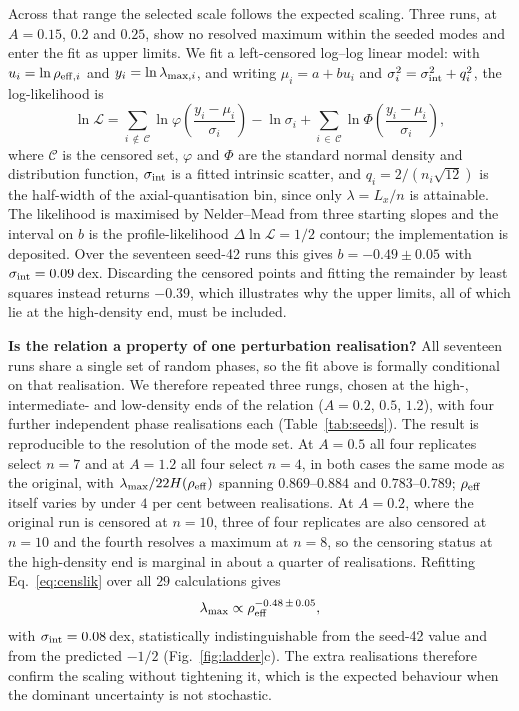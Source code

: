 \documentclass[usenatbib,twoside,twocolumn]{mnras}
\begin{document}
Across that range the selected scale follows the expected scaling. Three runs, at $A=0.15$, $0.2$ and $0.25$, show no resolved maximum within the seeded modes and enter the fit as upper limits. We fit a left-censored log--log linear model: with $u_i=\ln\rho_{{\rm eff},i}$ and $y_i=\ln\lambda_{{\rm max},i}$, and writing $\mu_i=a+bu_i$ and $\sigma_i^2=\sigma_{\rm int}^2+q_i^2$, the log-likelihood is
\begin{equation}
\ln\mathcal{L}=\sum_{i\,\notin\,\mathcal{C}}\ln\varphi\!\left(\frac{y_i-\mu_i}{\sigma_i}\right)-\ln\sigma_i
+\sum_{i\,\in\,\mathcal{C}}\ln\Phi\!\left(\frac{y_i-\mu_i}{\sigma_i}\right),
\label{eq:censlik}
\end{equation}
where $\mathcal{C}$ is the censored set, $\varphi$ and $\Phi$ are the standard normal density and distribution function, $\sigma_{\rm int}$ is a fitted intrinsic scatter, and $q_i=2/(n_i\sqrt{12})$ is the half-width of the axial-quantisation bin, since only $\lambda=L_x/n$ is attainable. The likelihood is maximised by Nelder--Mead from three starting slopes and the interval on $b$ is the profile-likelihood $\Delta\ln\mathcal{L}=1/2$ contour; the implementation is deposited. Over the seventeen seed-42 runs this gives $b=-0.49\pm0.05$ with $\sigma_{\rm int}=0.09$\,dex. Discarding the censored points and fitting the remainder by least squares instead returns $-0.39$, which illustrates why the upper limits, all of which lie at the high-density end, must be included.

\smallskip\noindent\textbf{Is the relation a property of one perturbation realisation?} All seventeen runs share a single set of random phases, so the fit above is formally conditional on that realisation. We therefore repeated three rungs, chosen at the high-, intermediate- and low-density ends of the relation ($A=0.2$, $0.5$, $1.2$), with four further independent phase realisations each (Table~\ref{tab:seeds}). The result is reproducible to the resolution of the mode set. At $A=0.5$ all four replicates select $n=7$ and at $A=1.2$ all four select $n=4$, in both cases the same mode as the original, with $\lambda_{\rm max}/22H(\rho_{\rm eff})$ spanning $0.869$--$0.884$ and $0.783$--$0.789$; $\rho_{\rm eff}$ itself varies by under $4$ per cent between realisations. At $A=0.2$, where the original run is censored at $n=10$, three of four replicates are also censored at $n=10$ and the fourth resolves a maximum at $n=8$, so the censoring status at the high-density end is marginal in about a quarter of realisations. Refitting Eq.~\ref{eq:censlik} over all $29$ calculations gives
\begin{equation}
\lambda_{\rm max}\propto\rho_{\rm eff}^{-0.48\,\pm\,0.05},
\label{eq:ladderfit}
\end{equation}
with $\sigma_{\rm int}=0.08$\,dex, statistically indistinguishable from the seed-42 value and from the predicted $-1/2$ (Fig.~\ref{fig:ladder}c). The extra realisations therefore confirm the scaling without tightening it, which is the expected behaviour when the dominant uncertainty is not stochastic.
\end{document}

